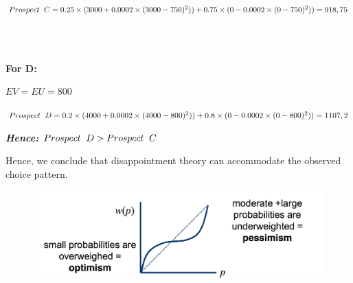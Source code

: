 \documentclass{article}
\begin{document}
$Prospect \hspace{2mm} C = 0.25 \times (3000 + 0.0002 \times (3000 - 750)^2)) + 0.75 \times (0 - 0.0002 \times (0 - 750)^2)) = 918,75$

\\
\\

\begin{flushleft}
\textbf{For D:}
\end{flushleft}
$EV=EU=800$

$Prospect \hspace{2mm} D = 0.2 \times (4000 + 0.0002 \times (4000 - 800)^2)) + 0.8 \times (0 - 0.0002 \times (0 - 800)^2)) = 1107,2$

\textbf{\textit{Hence:}} $Prospect \hspace{2mm} D > Prospect \hspace{2mm} C$

Hence, we conclude that disappointment theory can accommodate the observed choice pattern. 

\begin{figure}
\centering
\includegraphics[width=20cm]{graph.png}
\end{figure}
\end{document}
